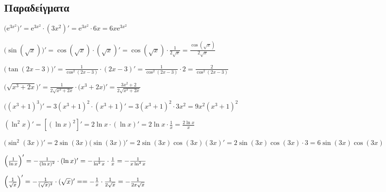   \subsection{Παραδείγματα}

  \begin{example}
    $ \bigl(\mathrm{e}^{3x^{2}}\bigr)' = \mathrm{e}^{3x^{2}} \cdot (3x^{2})' =
    \mathrm{e}^{3x^{2}} \cdot 6x = 6x \mathrm{e}^{3x^{2}} $
  \end{example}
  \begin{example}
    $ \bigl(\sin{(\sqrt{x})} \bigr)' = \cos{(\sqrt{x})} \cdot (\sqrt{x})' =
    \cos{(\sqrt{x})} \cdot \frac{1}{2 \sqrt{x}} = \frac{\cos{(\sqrt{x})}}{2 \sqrt{x}} $
  \end{example}
  \begin{example}
    $ \bigl(\tan{(2x-3)}\bigr)' = \frac{1}{\cos^{2}{(2x-3)}} \cdot (2x-3)' =
    \frac{1}{\cos^{2}{(2x-3)}} \cdot 2 = \frac{2}{\cos^{2}{(2x-3)}} $
  \end{example}
  \begin{example}
    $ \bigl(\sqrt{x^{3}+2x}\bigr)' = \frac{1}{2 \sqrt{x^{3}+2x}} 
    \cdot \bigl(x^{3}+2x\bigr)' = \frac{3x^{2}+2}{2 \sqrt{x^{3}+2x}} $
  \end{example}
  \begin{example}
    $ \bigl((x^{3}+1)^{3}\bigr)' = 3 (x^{3}+1)^{2} \cdot (x^{3}+1)' = 3 (x^{3}+1)^{2}
    \cdot 3x^{2} = 9 x^{2} (x^{3}+1)^{2} $
  \end{example}
  \begin{example}
    $ (\ln^{2}x)' = [(\ln{x} )^{2}]' = 2 \ln{x} \cdot (\ln{x} )' = 2 \ln{x} \cdot
    \frac{1}{x} = \frac{2 \ln{x}}{x} $
  \end{example}
  \begin{example}
    $ \bigl(\sin^{2}{(3x)}\bigr)' \!\! = 2 \sin{(3x)} \bigl(\sin{(3x)}\bigr)' 
    \! = 2 \sin{(3x)} \cos{(3x)} (3x)' 
    \! = 2 \sin{(3x)} \cos{(3x)} \cdot 3 
    \! = 6 \sin{(3x)} \cos{(3x)} \!\!\!\!\! $
  \end{example}
  \begin{example}
    $ \Bigl(\frac{1}{\ln{x}} \Bigr)' = - \frac{1}{(\ln{x} )^{2}} \cdot (\ln{x} )' 
    = - \frac{1}{\ln^{2}{x}} \cdot \frac{1}{x} = - \frac{1}{x \ln^{2}{x}} $ 
  \end{example}
  \begin{example}
    $ \Bigl(\frac{1}{\sqrt{x}}\Bigr)' = - \frac{1}{(\sqrt{x} )^{2}} \cdot (\sqrt{x})' = 
    = - \frac{1}{x} \cdot \frac{1}{2 \sqrt{x}} = - \frac{1}{2 x \sqrt{x}} $
  \end{example}
